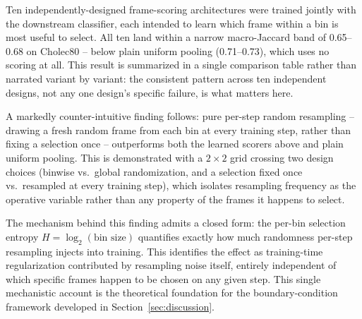 \documentclass[preprint,12pt]{elsarticle}
\begin{document}
Ten independently-designed frame-scoring architectures were trained jointly with the downstream classifier, each intended to learn which frame within a bin is most useful to select. All ten land within a narrow macro-Jaccard band of 0.65--0.68 on Cholec80 -- below plain uniform pooling (0.71--0.73), which uses no scoring at all. This result is summarized in a single comparison table rather than narrated variant by variant: the consistent pattern across ten independent designs, not any one design's specific failure, is what matters here.

A markedly counter-intuitive finding follows: pure per-step random resampling -- drawing a fresh random frame from each bin at every training step, rather than fixing a selection once -- outperforms both the learned scorers above and plain uniform pooling. This is demonstrated with a $2\times2$ grid crossing two design choices (binwise vs.\ global randomization, and a selection fixed once vs.\ resampled at every training step), which isolates resampling frequency as the operative variable rather than any property of the frames it happens to select.

The mechanism behind this finding admits a closed form: the per-bin selection entropy $H=\log_2(\text{bin size})$ quantifies exactly how much randomness per-step resampling injects into training. This identifies the effect as training-time regularization contributed by resampling noise itself, entirely independent of which specific frames happen to be chosen on any given step. This single mechanistic account is the theoretical foundation for the boundary-condition framework developed in Section~\ref{sec:discussion}.
\end{document}

